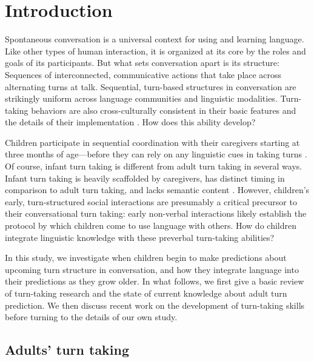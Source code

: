 \documentclass[authoryear, 12pt]{elsarticle}
\begin{document}
\linenumbers

\section{Introduction}
\label{sec:intro}

Spontaneous conversation is a universal context for using and learning language. Like other types of human interaction, it is organized at its core by the roles and goals of its participants. But what sets conversation apart is its structure: Sequences of interconnected, communicative actions that take place across alternating turns at talk. Sequential, turn-based structures in conversation are strikingly uniform across language communities and linguistic modalities. Turn-taking behaviors are also cross-culturally consistent in their basic features and the details of their implementation \citep{de-vos2015, dingemanse2013, stivers2009}. How does this ability develop? 

Children participate in sequential coordination with their caregivers starting at three months of age---before they can rely on any linguistic cues in taking turns \citep[see, among others, ][]{bateson1975, hilbrink2015, jaffe2001, snow1977}. Of course, infant turn taking is different from adult turn taking in several ways. Infant turn taking is heavily scaffolded by caregivers, has distinct timing in comparison to adult turn taking, and lacks semantic content \citep{hilbrink2015, jaffe2001}. However, children's early, turn-structured social interactions are presumably a critical precursor to their conversational turn taking: early non-verbal interactions likely establish the protocol by which children come to use language with others. How do children integrate linguistic knowledge with these preverbal turn-taking abilities? 


In this study, we investigate when children begin to make predictions about upcoming turn structure in conversation, and how they integrate language into their predictions as they grow older. In what follows, we first give a basic review of turn-taking research and the state of current knowledge about adult turn prediction. We then discuss recent work on the development of turn-taking skills before turning to the details of our own study.

\subsection{Adults' turn taking}
\end{document}
